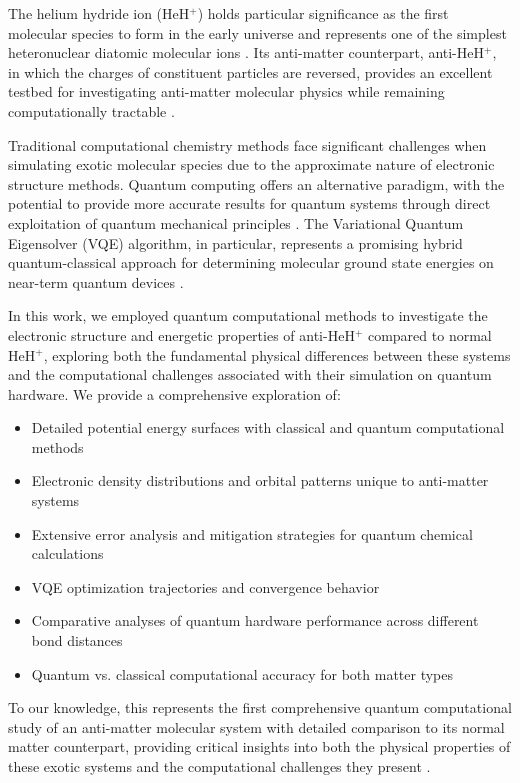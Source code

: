 \documentclass[10pt,twocolumn,a4paper]{article}
\begin{document}
The helium hydride ion (HeH$^+$) holds particular significance as the first molecular species to form in the early universe and represents one of the simplest heteronuclear diatomic molecular ions \cite{lee2019first}. Its anti-matter counterpart, anti-HeH$^+$, in which the charges of constituent particles are reversed, provides an excellent testbed for investigating anti-matter molecular physics while remaining computationally tractable \cite{czachorowski2020towards}.

Traditional computational chemistry methods face significant challenges when simulating exotic molecular species due to the approximate nature of electronic structure methods. Quantum computing offers an alternative paradigm, with the potential to provide more accurate results for quantum systems through direct exploitation of quantum mechanical principles \cite{cao2019quantum}. The Variational Quantum Eigensolver (VQE) algorithm, in particular, represents a promising hybrid quantum-classical approach for determining molecular ground state energies on near-term quantum devices \cite{peruzzo2014variational, mcclean2016theory}.

In this work, we employed quantum computational methods to investigate the electronic structure and energetic properties of anti-HeH$^+$ compared to normal HeH$^+$, exploring both the fundamental physical differences between these systems and the computational challenges associated with their simulation on quantum hardware. We provide a comprehensive exploration of:

\begin{itemize}
\item Detailed potential energy surfaces with classical and quantum computational methods
\item Electronic density distributions and orbital patterns unique to anti-matter systems
\item Extensive error analysis and mitigation strategies for quantum chemical calculations
\item VQE optimization trajectories and convergence behavior
\item Comparative analyses of quantum hardware performance across different bond distances
\item Quantum vs. classical computational accuracy for both matter types
\end{itemize}

To our knowledge, this represents the first comprehensive quantum computational study of an anti-matter molecular system with detailed comparison to its normal matter counterpart, providing critical insights into both the physical properties of these exotic systems and the computational challenges they present \cite{cerezo2021variational}.
\end{document}
